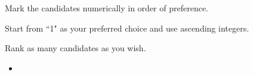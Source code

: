 \documentclass[14pt,onesided]{letter}
\def\option{\item[$\vcenter{\hbox{\Huge$\Box$}}$]}
\begin{document}
    \begin{center}
        \Huge{}
        \LARGE{}


        \Large{\textbf{}}
    \end{center}

    Mark the candidates numerically in order of preference. 

    Start from ``1" as your preferred choice and use ascending integers.

    Rank as many candidates as you wish.

    \begin{itemize}
            \option {}
    \end{itemize}
\end{document}
